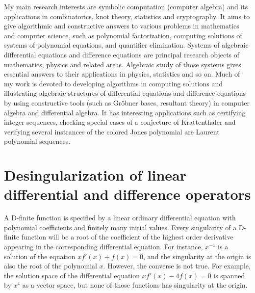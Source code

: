 \documentclass[10pt,a4paper]{article}
\begin{document}
My main research interests are symbolic computation (computer algebra) and its applications in combinatorics, knot theory, statistics 
and cryptography.  It aims to give algorithmic and constructive answers 
to various problems in mathematics and computer science, such as polynomial factorization, computing solutions of systems of polynomial equations, 
and quantifier elimination. Systems of algebraic differential equations and difference equations are principal research objects of mathematics, physics and related areas. 
Algebraic study of those systems gives essential answers to their applications in physics, statistics and so on. 
Much of my work is devoted to developing algorithms in  computing solutions and illustrating algebraic structures of differential equations and difference equations
by using constructive tools (such as Gr\"obner bases, resultant theory) in computer algebra and differential algebra. 
It has interesting applications such as certifying integer sequences, checking special cases of a conjecture of Krattenthaler and verifying 
several instrances of the colored Jones polynomial are Laurent polynomial sequences.  

\nopagebreak 
\section*{Desingularization of linear differential and difference operators}

A D-finite function is specified by a linear ordinary differential equation with polynomial 
coefficients and finitely many initial values. Every singularity of a D-finite function 
will be a root of the coefficient of the highest order derivative appearing 
in the corresponding differential equation. 
For instance, $x^{-1}$ is a solution of the equation $x f'(x) + f(x) = 0$, 
and the singularity at the origin is also the root of the polynomial $x$. 
However, the converse is not true. For example, the solution space of 
the differential equation $x f'(x) - 4 f(x) = 0$ is spanned by $x^4$ as a vector space, 
but none of those functions has singularity at the origin. 
\end{document}
